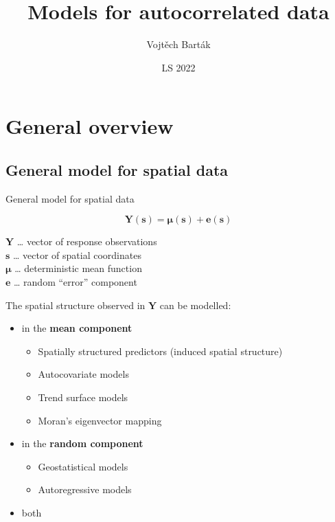 \documentclass[
  ignorenonframetext,
]{beamer}
\title{Models for autocorrelated data}
\author{Vojtěch Barták}
\date{LS 2022}
\providecommand{\tightlist}{%
  \setlength{\itemsep}{0pt}\setlength{\parskip}{0pt}}
\begin{document}
\frame{\titlepage}

\begin{frame}[allowframebreaks]
  \tableofcontents[hideallsubsections]
\end{frame}
\hypertarget{general-overview}{%
\section{General overview}\label{general-overview}}

\hypertarget{general-model-for-spatial-data}{%
\subsection{General model for spatial
data}\label{general-model-for-spatial-data}}

\begin{frame}{General model for spatial data}
\small

\[\boldsymbol{Y}(\boldsymbol{s})=\boldsymbol{\mu}(\boldsymbol{s})+\boldsymbol{e}(\boldsymbol{s})\]

\(\boldsymbol{Y}\) \ldots{} vector of response observations\\
\(\boldsymbol{s}\) \ldots{} vector of spatial coordinates\\
\(\boldsymbol{\mu}\) \ldots{} deterministic mean function\\
\(\boldsymbol{e}\) \ldots{} random ``error'' component

The spatial structure observed in \(\boldsymbol{Y}\) can be modelled:

\begin{itemize}
\tightlist
\item
  in the \textbf{mean component}

  \begin{itemize}
  \tightlist
  \item
    Spatially structured predictors (induced spatial structure)
  \item
    Autocovariate models
  \item
    Trend surface models
  \item
    Moran's eigenvector mapping
  \end{itemize}
\item
  in the \textbf{random component}

  \begin{itemize}
  \tightlist
  \item
    Geostatistical models
  \item
    Autoregressive models
  \end{itemize}
\item
  both
\end{itemize}
\end{frame}
\end{document}
